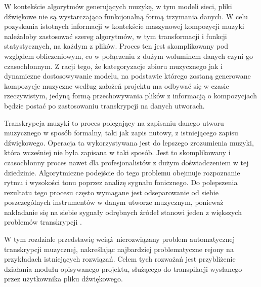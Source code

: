 \documentclass[12pt,a4paper,twoside]{mwart}
\begin{document}
W kontekście algorytmów generujących muzykę, w tym modeli sieci, pliki dźwiękowe nie są wystarczająco funkcjonalną formą trzymania danych. W celu pozyskania istotnych informacji w kontekście maszynowej kompozycji muzyki należałoby zastosować szereg algorytmów, w tym transformacji i funkcji statystycznych, na każdym z plików. Proces ten jest skomplikowany pod względem obliczeniowym, co w połączeniu z dużym woluminem danych czyni go czasochłonnym. Z racji tego, że kategoryzacje zbioru muzycznego jak i dynamiczne dostosowywanie modelu, na podstawie którego zostaną generowane kompozycje muzyczne według założeń projektu ma odbywać się w czasie rzeczywistym, jedyną formą przechowywania plików z informacją o kompozycjach będzie postać po zastosowaniu transkrypcji na danych utworach.


Transkrypcja muzyki to proces polegający na zapisaniu danego utworu muzycznego w sposób formalny, taki jak zapis nutowy, z istniejącego zapisu dźwiękowego. Operacja ta wykorzystywana jest do lepszego zrozumienia muzyki, która wcześniej nie była zapisana w taki sposób. Jest to skomplikowany i czasochłonny proces nawet dla profesjonalistów z dużym doświadczeniem w tej dziedzinie. Algorytmiczne podejście do tego problemu obejmuje rozpoznanie rytmu i wysokości tonu poprzez analizę sygnału fonicznego. Do polepszenia rezultatu tego procesu często wymagane jest odseparowanie od siebie poszczególnych instrumentów w danym utworze muzycznym, ponieważ nakładanie się na siebie sygnały odrębnych źródeł stanowi jeden z większych problemów transkrypcji \cite[67]{Homerecording:LevelUp}. 

W tym rozdziale przedstawię wciąż nierozwiązany problem automatycznej transkrypcji muzycznej, nakreślając najbardziej problematyczne rejony na przykładach istniejących rozwiązań.  Celem tych rozważań jest przybliżenie działania modułu opisywanego projektu, służącego do transpilacji wysłanego przez użytkownika pliku dźwiękowego.
\end{document}
